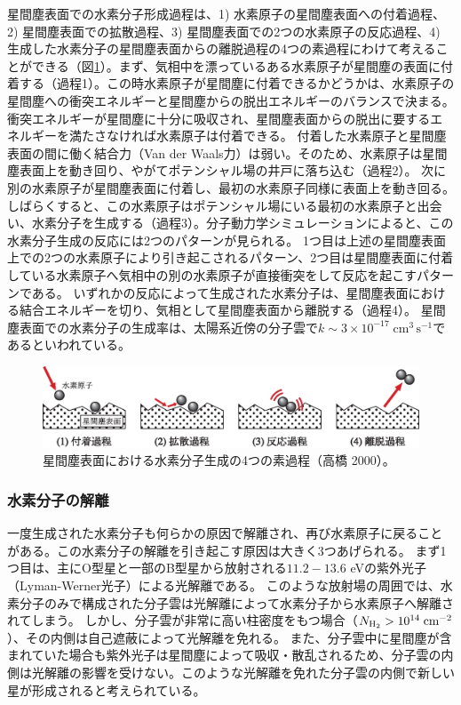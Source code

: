 星間塵表面での水素分子形成過程は、1) 水素原子の星間塵表面への付着過程、2) 星間塵表面での拡散過程、3) 星間塵表面での2つの水素原子の反応過程、4) 生成した水素分子の星間塵表面からの離脱過程の4つの素過程にわけて考えることができる（図\ref{fig:grain}）。まず、気相中を漂っているある水素原子が星間塵の表面に付着する（過程1）。この時水素原子が星間塵に付着できるかどうかは、水素原子の星間塵への衝突エネルギーと星間塵からの脱出エネルギーのバランスで決まる。衝突エネルギーが星間塵に十分に吸収され、星間塵表面からの脱出に要するエネルギーを満たさなければ水素原子は付着できる。
付着した水素原子と星間塵表面の間に働く結合力（Van der Waals力）は弱い。そのため、水素原子は星間塵表面上を動き回り、やがてポテンシャル場の井戸に落ち込む（過程2）。
次に別の水素原子が星間塵表面に付着し、最初の水素原子同様に表面上を動き回る。しばらくすると、この水素原子はポテンシャル場にいる最初の水素原子と出会い、水素分子を生成する（過程3）。分子動力学シミュレーションによると、この水素分子生成の反応には2つのパターンが見られる\citep{1999MNRAS.306...22T}。
1つ目は上述の星間塵表面上での2つの水素原子により引き起こされるパターン、2つ目は星間塵表面に付着している水素原子へ気相中の別の水素原子が直接衝突をして反応を起こすパターンである。
いずれかの反応によって生成された水素分子は、星間塵表面における結合エネルギーを切り、気相として星間塵表面から離脱する（過程4）。
星間塵表面での水素分子の生成率は、太陽系近傍の分子雲で$k\sim 3 \times 10^{-17} \; \mbox{cm}^3\, 
\mbox{s}^{-1}$であるといわれている\citep{1975ApJ...197..575J}。


\begin{figure}[tbp]\label{fig:grain}
\begin{center}
\includegraphics[width=\linewidth]{galaxy/h2form.eps}
\end{center}
\caption{星間塵表面における水素分子生成の4つの素過程（高橋 2000）。}
\end{figure}

\subsubsection{水素分子の解離}

一度生成された水素分子も何らかの原因で解離され、再び水素原子に戻ることがある。この水素分子の解離を引き起こす原因は大きく3つあげられる。
まず1つ目は、主にO型星と一部のB型星から放射される$11.2-13.6$ eVの紫外光子（Lyman-Werner光子）による光解離である。 このような放射場の周囲では、水素分子のみで構成された分子雲は光解離によって水素分子から水素原子へ解離されてしまう。
しかし、分子雲が非常に高い柱密度をもつ場合（$N_{{\rm H}_2}>10^{14} \; \mbox{cm}^{-2}$）、その内側は自己遮蔽によって光解離を免れる\citep{1996ApJ...468..269D}。
また、分子雲中に星間塵が含まれていた場合も紫外光子は星間塵によって吸収・散乱されるため、分子雲の内側は光解離の影響を受けない。このような光解離を免れた分子雲の内側で新しい星が形成されると考えられている。

